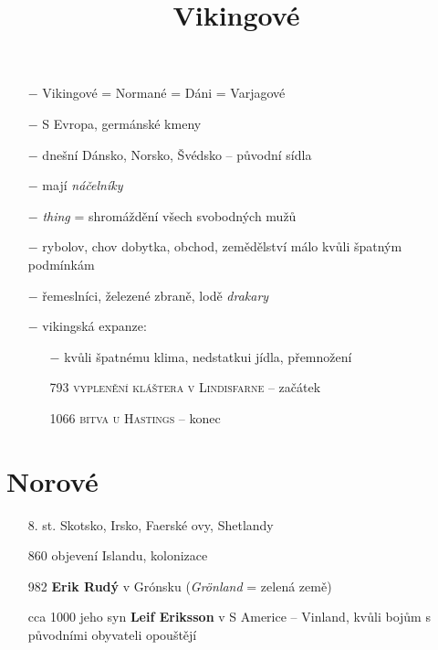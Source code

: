 \documentclass{article}
\title{\vspace{-2cm}Vikingové\vspace{-1.7cm}}
\date{}
\author{}
\begin{document}
\maketitle
\begin{itemize}
    \vspace{-0.5em}
    \setlength\itemsep{0.15em}
    \item[$-$] Vikingové = Normané = Dáni = Varjagové
    \item[$-$] S Evropa, germánské kmeny
    \item[$-$] dnešní Dánsko, Norsko, Švédsko -- původní sídla
    \item[$-$] mají \textit{náčelníky}
    \item[$-$] \textit{thing} = shromáždění všech svobodných mužů
    \item[$-$] rybolov, chov dobytka, obchod, zemědělství málo kvůli špatným podmínkám
    \item[$-$] řemeslníci, železené zbraně, lodě \textit{drakary}
    \item[$-$] vikingská expanze:
        \begin{itemize}
            \vspace{-0.5em}
            \setlength\itemsep{0.15em}
            \item[$-$] kvůli špatnému klima, nedstatkui jídla, přemnožení
            \item[793] \textsc{vyplenění kláštera v Lindisfarne} -- začátek
            \item[1066] \textsc{bitva u Hastings} -- konec
        \end{itemize}
\end{itemize}

\section*{Norové}
\begin{itemize}
    \vspace{-0.5em}
    \setlength\itemsep{0.15em}
    \item[8. st.] Skotsko, Irsko, Faerské ovy, Shetlandy
    \item[860] objevení Islandu, kolonizace
    \item[982] \textbf{Erik Rudý} v Grónsku (\textit{Grönland} = zelená země)
    \item[cca 1000] jeho syn \textbf{Leif Eriksson} v S Americe -- Vinland, kvůli bojům s původními obyvateli opouštějí
\end{itemize}
\end{document}
